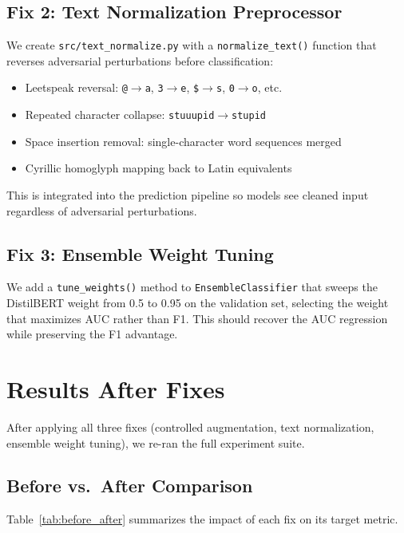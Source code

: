 \documentclass[11pt,a4paper]{article}
\begin{document}
\subsection{Fix 2: Text Normalization Preprocessor}
We create \texttt{src/text\_normalize.py} with a \texttt{normalize\_text()} function that reverses adversarial perturbations before classification:
\begin{itemize}[nosep]
  \item Leetspeak reversal: \texttt{@}$\to$\texttt{a}, \texttt{3}$\to$\texttt{e}, \texttt{\$}$\to$\texttt{s}, \texttt{0}$\to$\texttt{o}, etc.
  \item Repeated character collapse: \texttt{stuuupid}$\to$\texttt{stupid}
  \item Space insertion removal: single-character word sequences merged
  \item Cyrillic homoglyph mapping back to Latin equivalents
\end{itemize}
This is integrated into the prediction pipeline so models see cleaned input regardless of adversarial perturbations.

\subsection{Fix 3: Ensemble Weight Tuning}
We add a \texttt{tune\_weights()} method to \texttt{EnsembleClassifier} that sweeps the DistilBERT weight from 0.5 to 0.95 on the validation set, selecting the weight that maximizes AUC rather than F1.
This should recover the AUC regression while preserving the F1 advantage.

\section{Results After Fixes}
\label{sec:results_after}

After applying all three fixes (controlled augmentation, text normalization, ensemble weight tuning), we re-ran the full experiment suite.

\subsection{Before vs.\ After Comparison}

Table~\ref{tab:before_after} summarizes the impact of each fix on its target metric.
\end{document}
